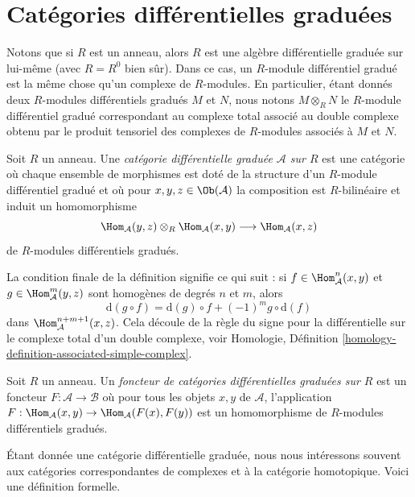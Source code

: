 \section{Catégories différentielles graduées}
\label{section-dga-categories}

\noindent
Notons que si $R$ est un anneau, alors $R$ est une algèbre différentielle graduée
sur lui-même (avec $R = R^0$ bien sûr). Dans ce cas, un $R$-module différentiel
gradué est la même chose qu'un complexe de $R$-modules. En particulier, étant
donnés deux $R$-modules différentiels gradués $M$ et $N$, nous notons $M \otimes_R
N$ le $R$-module différentiel gradué correspondant au complexe total associé au
double complexe obtenu par le produit tensoriel des complexes de $R$-modules
associés à $M$ et $N$.

\begin{definition}
\label{definition-dga-category}
Soit $R$ un anneau. Une {\it catégorie différentielle graduée $\mathcal{A}$ sur
$R$} est une catégorie où chaque ensemble de morphismes est doté de la structure
d'un $R$-module différentiel gradué et où pour $x, y, z \in \Ob(\mathcal{A})$ la
composition est $R$-bilinéaire et induit un homomorphisme
$$
\Hom_\mathcal{A}(y, z) \otimes_R \Hom_\mathcal{A}(x, y)
\longrightarrow
\Hom_\mathcal{A}(x, z)
$$
de $R$-modules différentiels gradués.
\end{definition}

\noindent
La condition finale de la définition signifie ce qui suit : si $f \in
\Hom_\mathcal{A}^n(x, y)$ et $g \in \Hom_\mathcal{A}^m(y, z)$ sont homogènes de
degrés $n$ et $m$, alors
$$
\text{d}(g \circ f) = \text{d}(g) \circ f + (-1)^mg \circ \text{d}(f)
$$
dans $\Hom_\mathcal{A}^{n + m + 1}(x, z)$. Cela découle de la règle du signe pour
la différentielle sur le complexe total d'un double complexe, voir Homologie,
Définition \ref{homology-definition-associated-simple-complex}.

\begin{definition}
\label{definition-functor-dga-categories}
Soit $R$ un anneau. Un {\it foncteur de catégories différentielles graduées sur
$R$} est un foncteur $F : \mathcal{A} \to \mathcal{B}$ où pour tous les objets $x,
y$ de $\mathcal{A}$, l'application $F : \Hom_\mathcal{A}(x, y) \to
\Hom_\mathcal{A}(F(x), F(y))$ est un homomorphisme de $R$-modules différentiels
gradués.
\end{definition}

\noindent
Étant donnée une catégorie différentielle graduée, nous nous intéressons souvent
aux catégories correspondantes de complexes et à la catégorie homotopique. Voici
une définition formelle.

